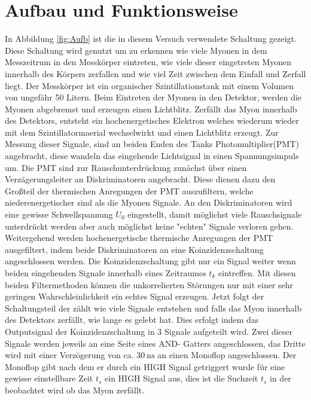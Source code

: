 \section{Aufbau und Funktionsweise}

    In Abbildung \ref{fig:Aufb} ist die in diesem Versuch verwendete Schaltung gezeigt.
    Diese Schaltung wird genutzt um zu erkennen wie viele Myonen in dem Messzeitrum in den Messkörper eintreten, wie viele dieser eingetreten Myonen innerhalb des Körpers zerfallen und wie viel Zeit zwischen dem Einfall und Zerfall liegt.
    Der Messkörper ist ein organischer Szintillationstank mit einem Volumen von ungefähr 50 Litern.
    Beim Eintreten der Myonen in den Detektor, werden die Myonen abgebremst und erzeugen einen Lichtblitz.
    Zerfällt das Myon innerhalb des Detektors, entsteht ein hochenergetisches Elektron welches wiederum wieder mit dem Szintillatormaerial wechselwirkt und einen Lichtblitz erzeugt.
    Zur Messung dieser Signale, sind an beiden Enden des Tanks Photomultiplier(PMT) angebracht, diese wandeln das eingehende Lichtsignal in einen Spannungsimpuls um. 
    Die PMT sind zur Rauschunterdrückung zunächst über einen Verzägerungsleiter an Diskriminatoren angebracht.
    Diese dienen dazu den Großteil der thermischen Anregungen der PMT auszufiltern, welche niederenergetischer sind als die Myonen Signale.
    An den Diskriminatoren wird eine gewisse Schwellspannung $U_0$ eingestellt, damit möglichst viele Rauschsignale unterdrückt werden aber auch möglichst keine "echten" Signale verloren gehen.
    Weitergehend werden hochenergetische thermische Anregungen der PMT ausgefiltert, indem beide Diskriminatoren an eine Koinzidenzschaltung angeschlossen werden.
    Die Koinzidenzschaltung gibt nur ein Signal weiter wenn beiden eingehenden Signale innerhalb eines Zeitraumes $t_k$ eintreffen. 
    Mit diesen beiden Filtermethoden können die unkorrelierten Störungen nur mit einer sehr geringen Wahrschleinlichkeit ein echtes Signal erzeugen.
    Jetzt folgt der Schaltungsteil der zählt wie viele Signale entstehen und falls das Myon innerhalb des Detektors zerfällt, wie lange es gelebt hat.
    Dies erfolgt indem das Outputsignal der Koinzidenzschaltung in 3 Signale aufgeteilt wird.
    Zwei dieser Signale werden jeweils an eine Seite eines AND- Gatters angeschlossen, das Dritte wird mit einer Verzögerung von ca. $\SI{30}{\nano\second}$ an einen Monoflop angeschlossen.
    Der Monoflop gibt nach dem er durch ein HIGH Signal getriggert wurde für eine gewisse einstellbare Zeit $t_s$ ein HIGH Signal aus, dies ist die Suchzeit $t_s$ in der beobachtet wird ob das Myon zerfällt.
